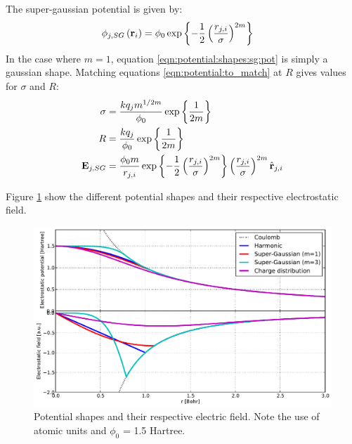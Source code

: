 The super-gaussian potential is given by:
\begin{align}
\phi_{j,SG}\left( \textbf{r}_i \right) & = \phi_0 \exp{ \left\{ 
                            -\frac{1}{2} \left( \frac{r_{j,i}}{\sigma} \right)^{2m}
                         \right\}}
\label{eqn:potential:shapes:sg:pot}
\end{align}
In the case where $m = 1$, equation \ref{eqn:potential:shapes:sg:pot} is simply
a gaussian shape. Matching equations \eqref{eqn:potential:to_match} at $R$ gives
values for $\sigma$ and $R$:
\begin{subequations}
\begin{align}
\sigma  & = \frac{k q_j m^{1/2m}}{\phi_0} \exp{ \left\{ \frac{1}{2m} \right\}} \\
R       & = \frac{k q_j}{\phi_0} \exp{ \left\{ \frac{1}{2m} \right\}} \\
\textbf{E}_{j,SG} & = \frac{\phi_0 m}{r_{j,i}}
                \exp{ \left\{ -\frac{1}{2} \left( \frac{r_{j,i}}{\sigma} \right)^{2m} \right\}}
                \left(  \frac{r_{j,i}}{\sigma}  \right)^{2m}
                \hat{\textbf{r}}_{j,i}
\end{align}
\label{eqn:potential:shapes:sg}
\end{subequations}

Figure \ref{fig:potential:shapes} show the different potential shapes and their
respective electrostatic field.

\begin{figure}
    \begin{center}
\includegraphics[width=0.98\columnwidth]{figures/potential_shapes}
    \end{center}
    \caption{\label{fig:potential:shapes}Potential shapes and their respective
electric field. Note the use of atomic units and $\phi_0$ = 1.5 Hartree.}
\end{figure}


